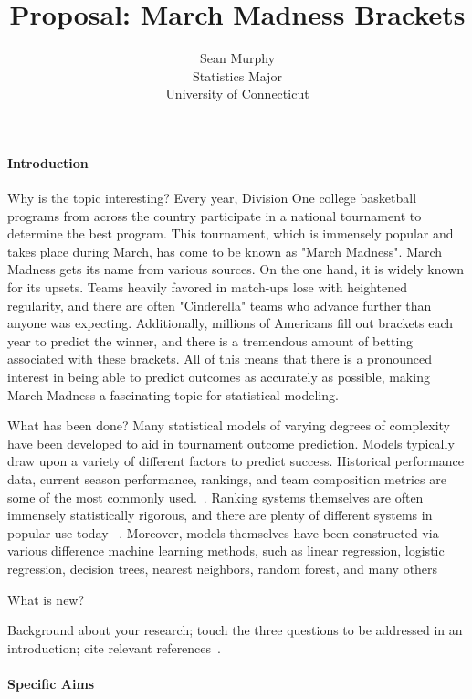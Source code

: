 \documentclass[12pt]{article}
\title{Proposal: March Madness Brackets}
\author{Sean Murphy\\
  Statistics Major\\
  University of Connecticut
}
\begin{document}
\maketitle


\paragraph{Introduction}

Why is the topic interesting?
Every year, Division One college basketball programs from across the country participate in a national tournament to determine the best program.  This tournament, which is immensely popular and takes place during March, has come to be known as "March Madness".  March Madness gets its name from various sources.  On the one hand, it is widely known for its upsets.  Teams heavily favored in match-ups lose with heightened regularity, and there are often "Cinderella" teams who advance further than anyone was expecting.  Additionally, millions of Americans fill out brackets each year to predict the winner, and there is a tremendous amount of betting associated with these brackets.  All of this means that there is a pronounced interest in being able to predict outcomes as accurately as possible, making March Madness a fascinating topic for statistical modeling.  

What has been done?
Many statistical models of varying degrees of complexity have been developed to aid in tournament outcome prediction.  Models typically draw upon a variety of different factors to predict success.  Historical performance data, current season performance, rankings, and team composition metrics are some of the most commonly used.~\citep{toutkoushian2011predicting}.  Ranking systems themselves are often immensely statistically rigorous, and there are plenty of different systems in popular use today ~\citep{steinberg2018march}.  Moreover, models themselves have been constructed via various difference machine learning methods, such as linear regression, logistic regression, decision trees, nearest neighbors, random forest, and many others ~\citep{}

What is new?

Background about your research; touch the three questions to be addressed in an
introduction; cite relevant references~\citep[e.g.,][]{dwivedi2017analysis}.


\paragraph{Specific Aims}
\end{document}
